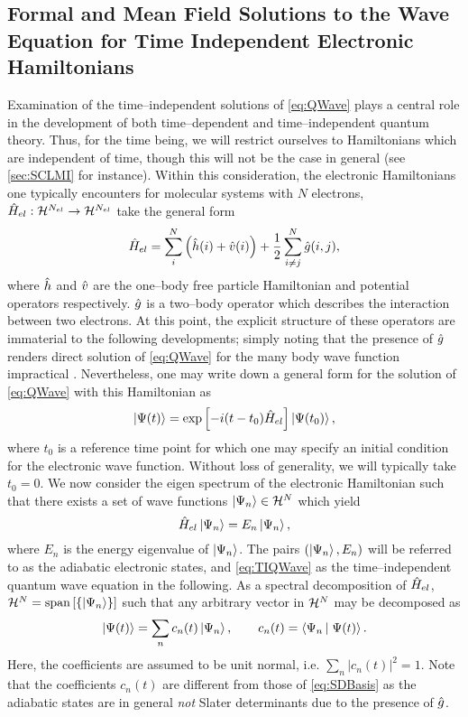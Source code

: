 \subsection{Formal and Mean Field Solutions to the Wave Equation for Time Independent 
  Electronic Hamiltonians}
\label{sec:MF}

Examination of the time--independent solutions of \cref{eq:QWave} plays a central role in the development
of both time--dependent and time--independent quantum theory. Thus, for the time being, we will restrict
ourselves to Hamiltonians which are independent of time, though this will not be the case in general
(see \cref{sec:SCLMI} for instance).
Within this consideration, the electronic Hamiltonians one typically encounters for molecular systems with $N$ electrons,
$\hat{H}_{el} : \mathcal{H}^{N_{el}} \rightarrow \mathcal{H}^{N_{el}}$ take the general form
\begin{equation}
\label{eq:GenElHam}
\hat{H}_{el} = \sum_{i}^{N} \left( \hat{h}(i) + \hat{v}(i) \right) + \frac{1}{2}\sum_{i \neq j}^{N} \hat{g}(i,j),
\end{equation}
where $\hat{h}$ and $\hat{v}$ are the one--body free particle Hamiltonian and potential operators respectively.
$\hat{g}$ is a two--body operator which describes the interaction between two electrons.
At this point, the explicit structure of these operators are immaterial to the following developments; simply
noting that the presence of $\hat{g}$ renders direct solution of \cref{eq:QWave} for the many body
wave function impractical . Nevertheless, one may write down a general form for the solution
of \cref{eq:QWave} with this Hamiltonian as 
\begin{equation}
\left\vert \Psi (t) \right\rangle = \exp \left[ -i(t - t_0) \hat{H}_{el} \right] \left\vert \Psi (t_0)  \right\rangle,
\end{equation}
where $t_0$ is a reference time point for which one may specify an initial condition for the electronic 
wave function. Without loss of generality, we will typically take $t_0 = 0$. We now consider the eigen
spectrum of the electronic Hamiltonian such that there exists a set of wave functions $\left\vert \Psi_n \right\rangle \in \mathcal{H}^N$
which yield
\begin{equation}
\label{eq:TIQWave}
\hat{H}_{el} \left\vert \Psi_n \right\rangle = E_n \left\vert \Psi_n \right\rangle,
\end{equation}
where $E_n$ is the energy eigenvalue of $\left\vert \Psi_n \right\rangle$. The pairs $(\left\vert \Psi_n \right\rangle,E_n)$ will be referred to
as the adiabatic electronic states, and  \cref{eq:TIQWave} as the time--independent quantum wave equation 
in the following. As a spectral decomposition of $\hat{H}_{el}$, $\mathcal{H}^{N} = \mathrm{span}\left[ \left \lbrace \left\vert \Psi_n \right\rangle \right\rbrace \right]$
such that any arbitrary vector in $\mathcal{H}^{N}$ may be decomposed as
\begin{equation}
\left\vert \Psi (t)  \right\rangle = \sum_n c_n(t) \left\vert \Psi_n \right\rangle,\qquad c_n(t) = \left\langle \Psi_n \left\vert\right. \Psi(t) \right\rangle.
\end{equation}
Here, the coefficients are assumed to be unit normal, i.e. $\sum_n\vert c_n (t) \vert^2 = 1$. 
Note that the coefficients $c_n(t)$ are different from those of \cref{eq:SDBasis} as the
adiabatic states are in general \emph{not} Slater determinants due to the presence of $\hat{g}$.


